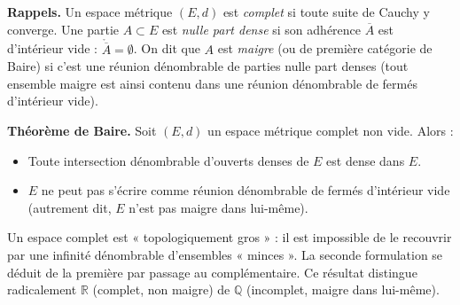 ﻿%



\begin{tcolorbox}[thmbox]
  \textbf{Rappels.}\enspace{}
  Un espace métrique $(E,d)$ est \emph{complet} si toute suite de
  Cauchy y converge.
  Une partie $A \subset E$ est \emph{nulle part dense}
  si son adhérence $\overline{A}$ est d'intérieur vide :
  $\mathring{\overline{A}} = \emptyset$.
  On dit que $A$ est \emph{maigre} (ou de première
  catégorie de Baire) si c'est une réunion dénombrable de parties nulle part
  denses (tout ensemble maigre est ainsi contenu dans une réunion dénombrable
  de fermés d'intérieur vide).

  \medskip
  \textbf{Théorème de Baire.}\enspace{}
  Soit $(E,d)$ un espace métrique complet non vide. Alors :
  \begin{itemize}
    \item Toute intersection dénombrable d'ouverts denses de $E$ est dense
          dans $E$.
    \item $E$ ne peut pas s'écrire comme réunion dénombrable de fermés
          d'intérieur vide (autrement dit, $E$ n'est pas maigre dans lui-même).
  \end{itemize}
\end{tcolorbox}

\begin{significationintuitive}
Un espace complet est « topologiquement gros » : il est impossible de le
recouvrir par une infinité dénombrable d'ensembles « minces ». La seconde
formulation se déduit de la première par passage au complémentaire.
Ce résultat distingue radicalement $\mathbb{R}$ (complet, non maigre) de
$\mathbb{Q}$ (incomplet, maigre dans lui-même).
\end{significationintuitive}

\decsep{}


